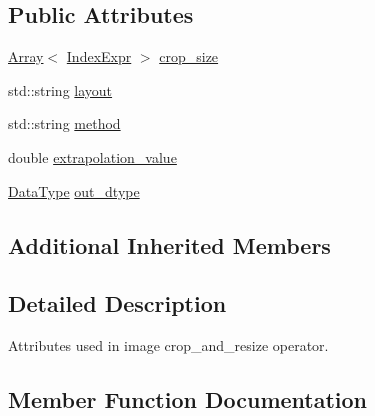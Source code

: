 \subsection*{Public Attributes}
\begin{DoxyCompactItemize}
\item 
\hyperlink{classtvm_1_1Array}{Array}$<$ \hyperlink{namespacetvm_1_1relay_ae153a27d81399fd266b8d598227764c4}{Index\+Expr} $>$ \hyperlink{structtvm_1_1relay_1_1CropAndResizeAttrs_aaf429a447bb693f1c86ee0cc091656f2}{crop\+\_\+size}
\item 
std\+::string \hyperlink{structtvm_1_1relay_1_1CropAndResizeAttrs_a3d8e178d59868617d4abed17fb002f31}{layout}
\item 
std\+::string \hyperlink{structtvm_1_1relay_1_1CropAndResizeAttrs_a4234e6ea86f6a7715d33bcfcb9171640}{method}
\item 
double \hyperlink{structtvm_1_1relay_1_1CropAndResizeAttrs_abb037f0a2525a31e1bc12439978e377d}{extrapolation\+\_\+value}
\item 
\hyperlink{namespacetvm_a41918af1a1dc386388639a9d3ad06c5d}{Data\+Type} \hyperlink{structtvm_1_1relay_1_1CropAndResizeAttrs_a956d7975f64d5ecb24db8962be4fad1d}{out\+\_\+dtype}
\end{DoxyCompactItemize}
\subsection*{Additional Inherited Members}


\subsection{Detailed Description}
Attributes used in image crop\+\_\+and\+\_\+resize operator. 

\subsection{Member Function Documentation}
